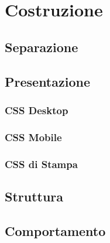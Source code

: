 \section{Costruzione}
    \subsection{Separazione}
    \subsection{Presentazione}
        \subsubsection{CSS Desktop}
        \subsubsection{CSS Mobile}
        \subsubsection{CSS di Stampa}
    \subsection{Struttura}
    \subsection{Comportamento}

